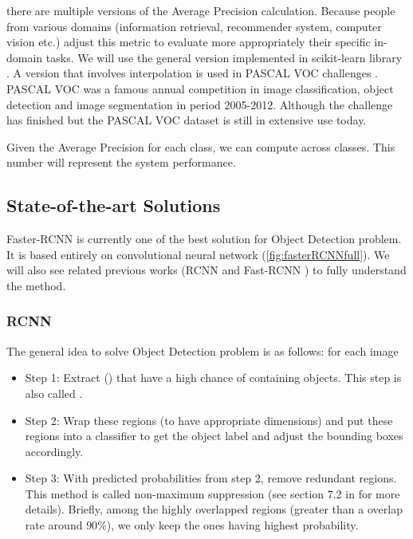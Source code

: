  there are multiple versions of the Average Precision calculation. Because people from various domains (information retrieval, recommender system, computer vision etc.) adjust this metric to evaluate more appropriately their specific in-domain tasks. We will use the general version implemented in scikit-learn library \cite{sklearnAPWeb}. A version \cite{Everingham2010} that involves interpolation is used in PASCAL VOC challenges \cite{Everingham2010}. PASCAL VOC was a famous annual competition in image classification, object detection and image segmentation in period 2005-2012. Although the challenge has finished but the PASCAL VOC dataset is still in extensive use today.

Given the Average Precision for each class, we can compute  across classes. This number will represent the system performance.
\subsection{State-of-the-art Solutions}
Faster-RCNN \cite{DBLP:journals/corr/RenHG015} is currently one of the best solution for Object Detection problem. It is based entirely on convolutional neural network (\ref{fig:fasterRCNNfull}). We will also see related previous works (RCNN \cite{DBLP:journals/corr/GirshickDDM13} and Fast-RCNN \cite{DBLP:journals/corr/Girshick15}) to fully understand the method.

\subsubsection{RCNN}
The general idea to solve Object Detection problem is as follows: for each image
\begin{itemize}
	\item Step 1: Extract  () that have a high chance of containing objects. This step is also called .
	\item Step 2: Wrap these regions (to have appropriate dimensions) and put these regions into a classifier to get the object label and adjust the bounding boxes accordingly.
	\item Step 3: With predicted probabilities from step 2, remove redundant regions. This method is called non-maximum suppression (see section 7.2 in \cite{Felzenszwalb:2010:ODD:1850486.1850574} for more details). Briefly, among the highly overlapped regions (greater than a overlap rate around $90\%$), we only keep the ones having highest probability.
\end{itemize}

